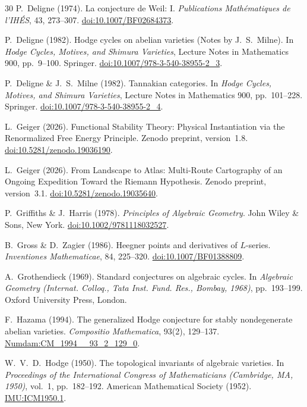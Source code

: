 \documentclass[aps,prd,twocolumn,superscriptaddress,nofootinbib]{revtex4-2}
\theoremstyle{definition}
\theoremstyle{remark}
\begin{document}
\begin{thebibliography}{30}
P.~Deligne (1974).
La conjecture de Weil: I.
\textit{Publications Mathématiques de l'IHÉS}, 43, 273--307.
\href{https://doi.org/10.1007/BF02684373}{doi:10.1007/BF02684373}.

P.~Deligne (1982).
Hodge cycles on abelian varieties (Notes by J.~S.~Milne).
In \textit{Hodge Cycles, Motives, and Shimura Varieties}, Lecture Notes in Mathematics 900, pp.\ 9--100. Springer.
\href{https://doi.org/10.1007/978-3-540-38955-2_3}{doi:10.1007/978-3-540-38955-2\_3}.

P.~Deligne \& J.~S.~Milne (1982).
Tannakian categories.
In \textit{Hodge Cycles, Motives, and Shimura Varieties}, Lecture Notes in Mathematics 900, pp.\ 101--228. Springer.
\href{https://doi.org/10.1007/978-3-540-38955-2_4}{doi:10.1007/978-3-540-38955-2\_4}.

L.~Geiger (2026).
Functional Stability Theory: Physical Instantiation via the Renormalized Free Energy Principle.
Zenodo preprint, version~1.8.
\href{https://doi.org/10.5281/zenodo.19036190}{doi:10.5281/zenodo.19036190}.

L.~Geiger (2026).
From Landscape to Atlas: Multi-Route Cartography of an Ongoing Expedition Toward the Riemann Hypothesis.
Zenodo preprint, version~3.1.
\href{https://doi.org/10.5281/zenodo.19035640}{doi:10.5281/zenodo.19035640}.

P.~Griffiths \& J.~Harris (1978).
\textit{Principles of Algebraic Geometry}.
John Wiley \& Sons, New York.
\href{https://doi.org/10.1002/9781118032527}{doi:10.1002/9781118032527}.

B.~Gross \& D.~Zagier (1986).
Heegner points and derivatives of $L$-series.
\textit{Inventiones Mathematicae}, 84, 225--320.
\href{https://doi.org/10.1007/BF01388809}{doi:10.1007/BF01388809}.

A.~Grothendieck (1969).
Standard conjectures on algebraic cycles.
In \textit{Algebraic Geometry (Internat. Colloq., Tata Inst. Fund. Res., Bombay, 1968)}, pp.\ 193--199. Oxford University Press, London.

F.~Hazama (1994).
The generalized Hodge conjecture for stably nondegenerate abelian varieties.
\textit{Compositio Mathematica}, 93(2), 129--137.
\href{http://www.numdam.org/item/CM_1994__93_2_129_0/}{Numdam:CM\_1994\_\_93\_2\_129\_0}.

W.~V.~D.~Hodge (1950).
The topological invariants of algebraic varieties.
In \textit{Proceedings of the International Congress of Mathematicians (Cambridge, MA, 1950)}, vol.~1, pp.\ 182--192. American Mathematical Society (1952).
\href{https://www.mathunion.org/fileadmin/IMU/ICM/ICM1950.1/ICM1950.1.ocr.pdf}{IMU:ICM1950.1}.


\end{thebibliography}
\end{document}
